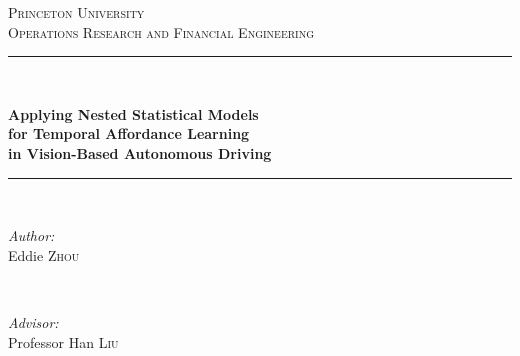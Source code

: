 \documentclass[11pt]{article}
\begin{document}
\begin{titlepage}

\newcommand{\HRule}{\rule{.8\linewidth}{0.5mm}} %
\renewenvironment{abstract}
 {\small
  \begin{center}
  \bfseries \abstractname\vspace{-.5em}\vspace{0pt}
  \end{center}
  \list{}{
    \setlength{\leftmargin}{.5cm}%
    \setlength{\rightmargin}{\leftmargin}%
  }%
  \item\relax}
 {\endlist}


\center %


\textsc{\LARGE Princeton University}\\[0.5cm] %
\textsc{\large Operations Research and Financial Engineering}\\[0.5cm] %

\vspace{2em}

\HRule \\[0.2cm]
{ \LARGE \bfseries Applying Nested Statistical Models\\
for Temporal Affordance Learning\\
in Vision-Based Autonomous Driving\par} %
\HRule \\[1.5cm]
 
\vspace{2em}

\begin{minipage}{0.4\textwidth}
\begin{flushleft} \large
\emph{Author:}\\
Eddie \textsc{Zhou} %
\end{flushleft}
\end{minipage}
~
\begin{minipage}{0.4\textwidth}
\begin{flushright} \large
\emph{Advisor:} \\
Professor Han \textsc{Liu} %
\end{flushright}
\end{minipage}\\[1cm]


\end{titlepage}
\end{document}
